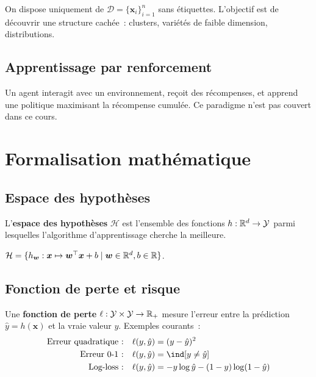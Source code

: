 On dispose uniquement de $\mathcal{D} = \{\bm{x}_i\}_{i=1}^n$ sans \'etiquettes.
L'objectif est de d\'ecouvrir une structure cach\'ee~: clusters, vari\'et\'es
de faible dimension, distributions.

\subsection{Apprentissage par renforcement}

Un agent interagit avec un environnement, re\c{c}oit des r\'ecompenses, et
apprend une politique maximisant la r\'ecompense cumul\'ee. Ce paradigme
n'est pas couvert dans ce cours.

\section{Formalisation math\'ematique}
\label{sec:formalization}

\subsection{Espace des hypoth\`eses}

\begin{definition}
L'\textbf{espace des hypoth\`eses}
$\mathcal{H}$ est l'ensemble des fonctions $h : \mathbb{R}^d \to \mathcal{Y}$ parmi
lesquelles l'algorithme d'apprentissage cherche la meilleure.
\end{definition}

\begin{exemple}
$\mathcal{H} = \{h_{\bm{w}} : \bm{x} \mapsto \bm{w}^\top \bm{x} + b
\mid \bm{w} \in \mathbb{R}^d, b \in \mathbb{R}\}$.
\end{exemple}

\subsection{Fonction de perte et risque}

\begin{definition}
Une \textbf{fonction de perte} $\ell : \mathcal{Y} \times \mathcal{Y} \to \mathbb{R}_+$
mesure l'erreur entre la pr\'ediction $\hat{y} = h(\bm{x})$ et la vraie
valeur $y$. Exemples courants~:
\begin{align}
  \text{Erreur quadratique~:} \quad & \ell(y, \hat{y}) = (y - \hat{y})^2 \\
  \text{Erreur 0-1~:} \quad & \ell(y, \hat{y}) = \ind[y \neq \hat{y}] \\
  \text{Log-loss~:} \quad & \ell(y, \hat{y}) = -y\log\hat{y} - (1-y)\log(1-\hat{y})
\end{align}
\end{definition}

